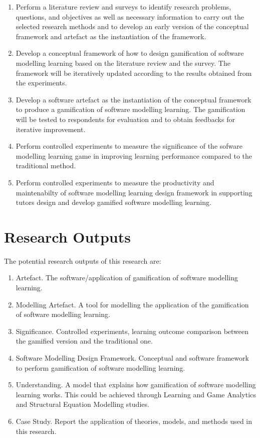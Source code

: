 \documentclass[12pt, a4paper]{report}
\begin{document}
\begin{enumerate}
\item Perform a literature review and surveys to identify research problems, questions, and objectives as well as necessary information to carry out the selected research methods and to develop an early version of the conceptual framework and artefact as the instantiation of the framework. 
\item Develop a conceptual framework of how to design gamification of software modelling learning based on the literature review and the survey. The framework will be iteratively updated according to the results obtained from the experiments. 
\item Develop a software artefact as the instantiation of the conceptual framework to produce a gamification of software modelling learning. The gamification will be tested to respondents for evaluation and to obtain feedbacks for iterative improvement. 
\item Perform controlled experiments to measure the significance of the sofware modelling learning game in improving learning performance compared to the traditional method.
\item Perform controlled experiments to measure the productivity and maintenabilty of software modelling learning design framework in supporting tutors design and develop gamified software modelling learning. 
\end{enumerate}

\section{Research Outputs}
The potential research outputs of this research are:
\begin{enumerate}
\item Artefact. The software/application of gamification of software modelling learning.
\item Modelling Artefact. A tool for modelling the application of the gamification of software modelling learning.
\item Significance. Controlled experiments, learning outcome comparison between the gamified version and the traditional one.
\item Software Modelling Design Framework. Conceptual and software framework to perform gamification of software modelling learning.
\item Understanding. A model that explains how gamification of software modelling learning works.
This could be achieved through Learning and Game Analytics and Structural Equation Modelling studies.
\item Case Study. Report the application of theories, models, and methods used in this research.
\end{enumerate}
\end{document}
